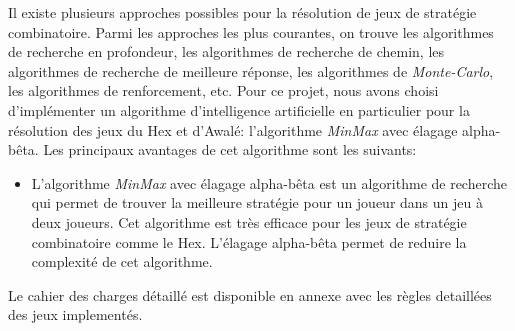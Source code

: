 Il existe plusieurs approches possibles pour la résolution de jeux de stratégie
combinatoire. Parmi les approches les plus courantes, on trouve les algorithmes
de recherche en profondeur, les algorithmes de recherche de chemin, les
algorithmes de recherche de meilleure réponse, les algorithmes de \emph{Monte-Carlo},
les algorithmes de renforcement, etc.
Pour ce projet, nous avons choisi d'implémenter un algorithme d'intelligence artificielle 
en particulier pour la résolution des jeux du Hex et d'Awalé: l'algorithme \emph{MinMax} avec élagage
alpha-bêta.
Les principaux avantages de cet algorithme sont les suivants:
\begin{itemize}
	\item L'algorithme \emph{MinMax} avec élagage alpha-bêta est un algorithme de recherche
	qui permet de trouver la meilleure stratégie pour un joueur dans un jeu à deux
	joueurs. Cet algorithme est très efficace pour les jeux de stratégie combinatoire
	comme le Hex. L'élagage alpha-bêta permet de reduire la complexité de cet algorithme.
\end{itemize}

Le cahier des charges détaillé est disponible en annexe avec les règles detaillées des jeux implementés.
